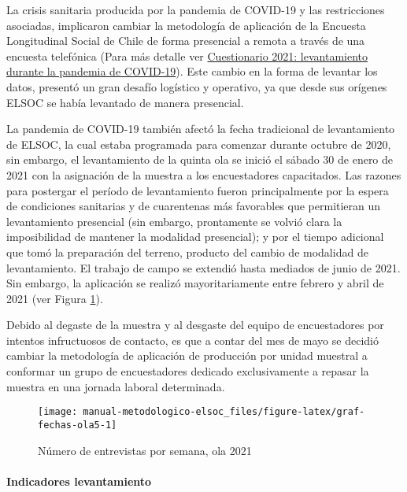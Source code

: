 \documentclass[
  12pt,
]{article}
\begin{document}
La crisis sanitaria producida por la pandemia de COVID-19 y las restricciones asociadas, implicaron cambiar la metodología de aplicación de la Encuesta Longitudinal Social de Chile de forma presencial a remota a través de una encuesta telefónica (Para más detalle ver \protect\hyperlink{instrumento-covid}{Cuestionario 2021: levantamiento durante la pandemia de COVID-19}). Este cambio en la forma de levantar los datos, presentó un gran desafío logístico y operativo, ya que desde sus orígenes ELSOC se había levantado de manera presencial.

La pandemia de COVID-19 también afectó la fecha tradicional de levantamiento de ELSOC, la cual estaba programada para comenzar durante octubre de 2020, sin embargo, el levantamiento de la quinta ola se inició el sábado 30 de enero de 2021 con la asignación de la muestra a los encuestadores capacitados. Las razones para postergar el período de levantamiento fueron principalmente por la espera de condiciones sanitarias y de cuarentenas más favorables que permitieran un levantamiento presencial (sin embargo, prontamente se volvió clara la imposibilidad de mantener la modalidad presencial); y por el tiempo adicional que tomó la preparación del terreno, producto del cambio de modalidad de levantamiento. El trabajo de campo se extendió hasta mediados de junio de 2021. Sin embargo, la aplicación se realizó mayoritariamente entre febrero y abril de 2021 (ver Figura \ref{fig:graf-fechas-ola5}).

Debido al degaste de la muestra y al desgaste del equipo de encuestadores por intentos infructuosos de contacto, es que a contar del mes de mayo se decidió cambiar la metodología de aplicación de producción por unidad muestral a conformar un grupo de encuestadores dedicado exclusivamente a repasar la muestra en una jornada laboral determinada.

\begin{figure}

{\centering \texttt{[image: manual-metodologico-elsoc\_files/figure-latex/graf-fechas-ola5-1]} 

}

\caption{Número de entrevistas por semana, ola 2021}\label{fig:graf-fechas-ola5}
\end{figure}

\hypertarget{indicadores-levantamiento-4}{%
\paragraph*{Indicadores levantamiento}\label{indicadores-levantamiento-4}}
\end{document}
